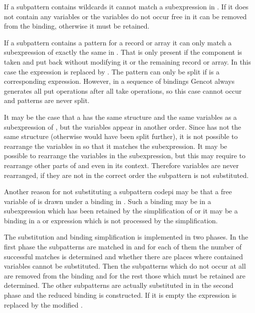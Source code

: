 If a subpattern  contains wildcards it cannot match a subexpression in . If it does not contain any variables
or the variables do not occur free in  it can be removed from the binding, otherwise it must be retained.

If a subpattern  contains a  pattern for a record or array it can only match a  subexpression 
of exactly the same in . That is only present if the component is taken and put back without modifying it or the 
remaining record or array. In this case the  expression is replaced by . 
The  pattern can only be split if  is a corresponding  expression. However, in a sequence
of bindings Gencot always generates all put operations after all take operations, so this case cannot occur and  
patterns are never split.

It may be the case that a  has the same structure and the same variables as a subexpression of , but the
variables appear in another order. Since  has not the same structure (otherwise  would have been split
further), it is not possible to rearrange the variables in  so that it matches the subexpression. It may be possible 
to rearrange the variables in the subexpression, but this may require to rearrange other parts of  and even in 
its context. Therefore variables are never rearranged, if they are not in the correct order the subpattern is not substituted.

Another reason for not substituting a subpattern code{pi} may be that a free variable of  is drawn under a binding
in . Such a binding may be in a  subexpression which has been retained by the simplification of 
or it may be a binding in a  or  expression which is not processed by the simplification.

The substitution and binding simplification is implemented in two phases. In the first phase the subpatterns are matched in 
 and for each of them the number of successful matches is determined and whether there are places where contained 
variables cannot be substituted. Then the subpatterns which do not occur at all are removed from the binding and for the rest
those which must be retained are determined. The other subpatterns are actually substituted in  in the second phase 
and the reduced binding is constructed. If it is empty the  expression is replaced by the modified .


